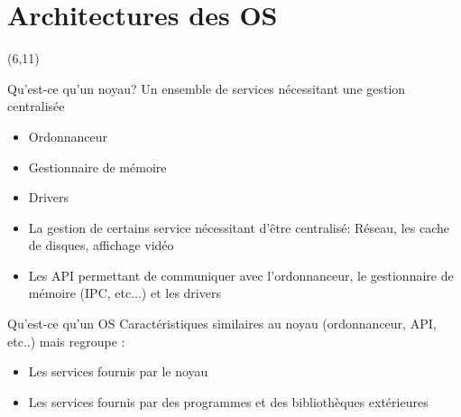 \part{Architectures des OS}

{
\begin{frame}[plain]
  \partpage
  \begin{textblock}{10}(6,11)
    \begin{quote}
      \rmfamily\textit\textbf\color{darkgray}{\large
        ``Why do programmers always mix up Halloween and Christmas?\\
        Because Oct 31 equals Dec 25.''}
    \end{quote}
  \end{textblock}
\end{frame}
}


\begin{frame}[fragile=singleslide]{Qu'est-ce qu'un noyau?}
  Un ensemble de services nécessitant une gestion centralisée
  \begin{itemize} 
  \item Ordonnanceur
  \item Gestionnaire de mémoire
  \item Drivers
  \item La gestion de  certains service nécessitant d'être centralisé:
    Réseau, les cache de disques, affichage vidéo
  \item  Les API  permettant  de communiquer  avec l'ordonnanceur,  le
    gestionnaire de mémoire (IPC, etc...) et les drivers
  \end{itemize} 
\end{frame} 

\begin{frame}[fragile=singleslide]{Qu'est-ce qu'un OS}
  Caractéristiques similaires au noyau (ordonnanceur, API, etc..) mais
  regroupe :
  \begin{itemize} 
  \item Les services fournis par le noyau
  \item Les  services fournis par des programmes  et des bibliothèques
    extérieures
  \end{itemize} 
\end{frame}

